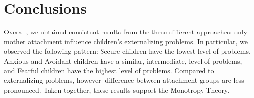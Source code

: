 \documentclass[
]{book}
\begin{document}
\hypertarget{conclusion-int}{%
\chapter{Conclusions}\label{conclusion-int}}

Overall, we obtained consistent results from the three different approaches: only mother attachment influence children's externalizing problems. In particular, we observed the following pattern: Secure children have the lowest level of problems, Anxious and Avoidant children have a similar, intermediate, level of problems, and Fearful children have the highest level of problems. Compared to externalizing problems, however, difference between attachment groups are less pronounced. Taken together, these results support the Monotropy Theory.

  
\end{document}
